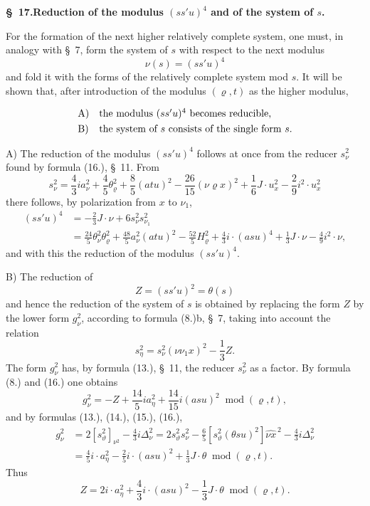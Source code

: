 \documentclass[11pt]{article}
\newcommand{\A}{\Delta}
\newcommand{\modu}[1]{\;\operatorname{mod} #1}
\providecommand{\modu}[1]{\;\operatorname{mod} #1}
\begin{document}
\begin{center}
\textbf{\S\ 17.\quad Reduction of the modulus $(ss'u)^4$ and of the system of $s$.}
\end{center}

For the formation of the next higher relatively complete system, one must, in analogy with \S\ 7, form the system of $s$ with respect to the next modulus
\[
\nu(s)=(ss'u)^4
\]
and fold it with the forms of the relatively complete system mod $s$. It will be shown that, after introduction of the modulus $(\varrho,t)$ as the higher modulus,
\[
\begin{array}{ll}
\text{A)}&\text{the modulus }(ss'u)^4\text{ becomes reducible,}\vphantom{\dfrac11}\\
\text{B)}&\text{the system of }s\text{ consists of the single form }s.
\end{array}
\]

A) The reduction of the modulus $(ss'u)^4$ follows at once from the reducer $s_\nu^2$ found by formula (16.), \S\ 11. From
\[
 s_\nu^2=\frac43 i a_\nu^2+\frac45\theta_\varrho^2+\frac85(atu)^2-
 \frac{26}{15}(\nu\varrho x)^2+\frac16J\cdot u_x^2-
 \frac29i^2\cdot u_x^2
\]
there follows, by polarization from $x$ to $\nu_1$,
\[
\tag{21}
\begin{aligned}
(ss'u)^4&=-\frac23J\cdot\nu+6s_\nu^2s_{\nu_1}^2\\
&=\frac{24}{5}\theta_\nu^2\theta_\varrho^2+
\frac{48}{5}a_\nu^2(atu)^2-
\frac{52}{5}H_\varrho^2+
\frac43i\cdot(asu)^4+\frac13J\cdot\nu-
\frac49i^2\cdot\nu,
\end{aligned}
\]
and with this the reduction of the modulus $(ss'u)^4$.


B) The reduction of
\[
Z=(ss'u)^2=\theta(s)
\]
and hence the reduction of the system of $s$ is obtained by replacing the form $Z$ by the lower form $g_\nu^2$, according to formula (8.)b, \S\ 7, taking into account the relation
\[
 s_\eta^2=s_\nu^2(\nu\nu_1x)^2-\frac13Z.
\]
The form $g_\nu^2$ has, by formula (13.), \S\ 11, the reducer $s_\nu^2$ as a factor. By formula (8.) and (16.) one obtains
\[
 g_\nu^2=-Z+\frac{14}{5}ia_\eta^2+\frac{14}{15}i(asu)^2
 \modu{(\varrho,t)},
\]
and by formulas (13.), (14.), (15.), (16.),
\[
\begin{aligned}
g_\nu^2&=2[s_\vartheta^2]_{\nu^2}-\frac43 i\A_\nu^2
      =2s_\vartheta^2s_\nu^2-\frac65[s_\vartheta^2(\theta su)^2]\widehat{\nu x}^{\,2}
        -\frac43i\A_\nu^2\\
&=\frac45i\cdot a_\eta^2-\frac25i\cdot(asu)^2+\frac13J\cdot\theta
\modu{(\varrho,t)}.
\end{aligned}
\]
Thus
\[
\tag{23}
 Z=2i\cdot a_\eta^2+\frac43i\cdot(asu)^2-\frac13J\cdot\theta
 \modu{(\varrho,t)}.
\]
\end{document}
